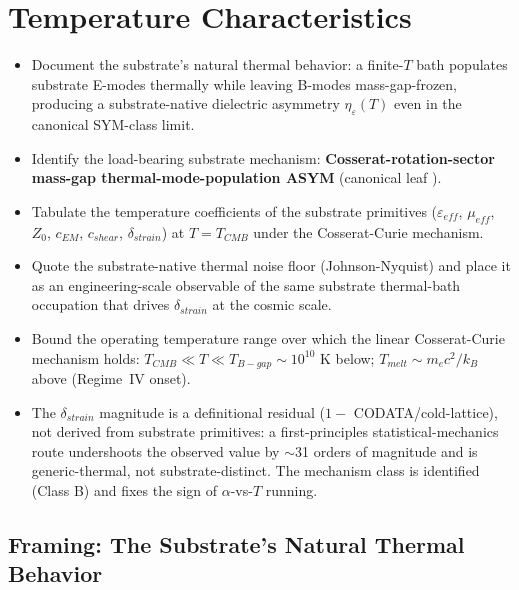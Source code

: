\chapter{Temperature Characteristics}
\label{ch:vol9_temperature_characteristics}

\begin{objectivebox}
\begin{itemize}
    \item Document the substrate's natural thermal behavior: a finite-$T$ bath populates substrate E-modes thermally while leaving B-modes mass-gap-frozen, producing a substrate-native dielectric asymmetry $\eta_\varepsilon(T)$ even in the canonical SYM-class limit.
    \item Identify the load-bearing substrate mechanism: \textbf{Cosserat-rotation-sector mass-gap thermal-mode-population ASYM} (canonical leaf ).
    \item Tabulate the temperature coefficients of the substrate primitives ($\varepsilon_{eff}$, $\mu_{eff}$, $Z_0$, $c_{EM}$, $c_{shear}$, $\delta_{strain}$) at $T = T_{CMB}$ under the Cosserat-Curie mechanism.
    \item Quote the substrate-native thermal noise floor (Johnson-Nyquist) and place it as an engineering-scale observable of the same substrate thermal-bath occupation that drives $\delta_{strain}$ at the cosmic scale.
    \item Bound the operating temperature range over which the linear Cosserat-Curie mechanism holds: $T_{CMB} \ll T \ll T_{B-gap} \sim 10^{10}$ K below; $T_{melt} \sim m_e c^2/k_B$ above (Regime~IV onset).
    \item The $\delta_{strain}$ magnitude is a definitional residual ($1 - $ CODATA/cold-lattice), not derived from substrate primitives: a first-principles statistical-mechanics route undershoots the observed value by $\sim$31 orders of magnitude and is generic-thermal, not substrate-distinct. The mechanism class is identified (Class B) and fixes the sign of $\alpha$-vs-$T$ running.
\end{itemize}
\end{objectivebox}

\section{Framing: The Substrate's Natural Thermal Behavior}
\label{sec:vol9_temperature_framing}

